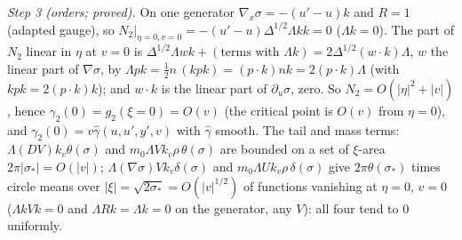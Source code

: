 \emph{Step 3 (orders; proved).} On one generator $\nabla_{x}\sigma = -(u' - u)k$ and $R = 1$ (adapted gauge), so $N_{2}|_{\eta = 0, v = 0} = -(u' - u)\Delta^{1/2}\Lambda k k = 0$ ($\Lambda k = 0$). The part of $N_{2}$ linear in $\eta$ at $v = 0$ is $\Delta^{1/2}\Lambda wk + (\text{terms with }\Lambda k) = 2\Delta^{1/2}(w\cdot k)\Lambda$, $w$ the linear part of $\nabla\sigma$, by $\Lambda pk = \tfrac12 n\,(kpk) = (p\cdot k)nk = 2(p\cdot k)\Lambda$ (with $kpk = 2(p\cdot k)k$); and $w\cdot k$ is the linear part of $\partial_{u}\sigma$, zero. So $N_{2} = O(|\eta|^{2} + |v|)$, hence $\gamma_{2}(0) = g_{2}(\xi = 0) = O(v)$ (the critical point is $O(v)$ from $\eta = 0$), and $\gamma_{2}(0) = v\hat\gamma(u, u', y', v)$ with $\hat\gamma$ smooth. The tail and mass terms: $\Lambda(DV)k_{v}\theta(\sigma)$ and $m_{0}\Lambda Vk_{v}\rho\,\theta(\sigma)$ are bounded on a set of $\xi$-area $2\pi|\sigma_{*}| = O(|v|)$; $\Lambda(\nabla\sigma)Vk_{v}\delta(\sigma)$ and $m_{0}\Lambda Uk_{v}\rho\,\delta(\sigma)$ give $2\pi\theta(\sigma_{*})$ times circle means over $|\xi| = \sqrt{2\sigma_{*}} = O(|v|^{1/2})$ of functions vanishing at $\eta = 0$, $v = 0$ ($\Lambda kVk = 0$ and $\Lambda Rk = \Lambda k = 0$ on the generator, any $V$): all four tend to $0$ uniformly.

